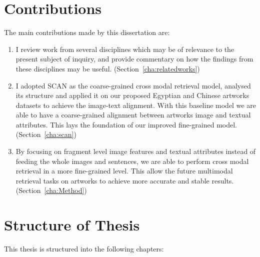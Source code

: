 \section{Contributions}
The main contributions made by this dissertation are:

\begin{enumerate}
    \item I review work from several disciplines which may be of relevance to the present subject of inquiry, and provide commentary on how the findings from these disciplines may be useful. (Section~\ref{cha:relatedworks})
    \item I adopted SCAN \cite{scan} as the coarse-grained cross modal retrieval model, analysed its structure and applied it on our proposed Egyptian and Chinese artworks datasets to achieve the image-text alignment. With this baseline model we are able to have a coarse-grained alignment between artworks image and textual attributes. This lays the foundation of our improved fine-grained model. (Section~\ref{cha:scan})
    \item By focusing on fragment level image features and textual attributes instead of feeding the whole images and sentences, we are able to perform cross modal retrieval in a more fine-grained level. This allow the future multimodal retrieval tasks on artworks to achieve more accurate and stable results. (Section~\ref{cha:Method})
\end{enumerate}


\section{Structure of Thesis}

This thesis is structured into the following chapters:

